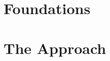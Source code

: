 \documentclass[12pt,oneside]{book}
\begin{document}
\newtheorem*{mydef}{Definition}






\part{Foundations}

%







\part{The Approach}

\end{document}
